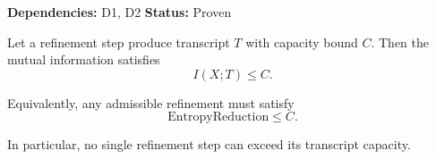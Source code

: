 \begin{lemma}
\textbf{Dependencies: } D1, D2
\textbf{Status: } Proven

Let a refinement step produce transcript $T$ with capacity bound $C$.
Then the mutual information satisfies
\[
I(X;T) \leq C.
\]

Equivalently, any admissible refinement must satisfy
\[
\mathrm{EntropyReduction} \leq C.
\]

In particular, no single refinement step can exceed its transcript capacity.
\end{lemma}
